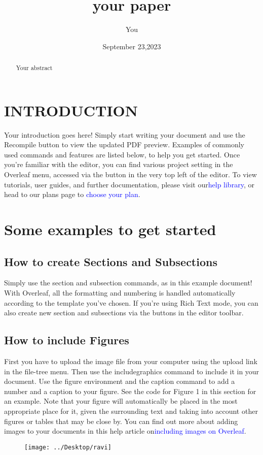 \documentclass{article}
\title{your paper}
\date{September 23,2023}
\author{You}
\begin{document}
	\maketitle
	\begin{abstract}
		Your abstract
		\end{abstract}
	\section{INTRODUCTION}
Your introduction goes here! Simply start writing your document and use the Recompile button to
view the updated PDF preview. Examples of commonly used commands and features are listed below,
to help you get started.
Once you’re familiar with the editor, you can find various project setting in the Overleaf menu,
accessed via the button in the very top left of the editor. To view tutorials, user guides, and further
documentation, please visit our\textcolor{blue}{help library}, or head to our plans page to \textcolor{blue}{choose your plan}.
\section{Some examples to get started}
\subsection{How to create Sections and Subsections}
Simply use the section and subsection commands, as in this example document! With Overleaf, all
the formatting and numbering is handled automatically according to the template you’ve chosen. If
you’re using Rich Text mode, you can also create new section and subsections via the buttons in the
editor toolbar.
\subsection{How to include Figures}
First you have to upload the image file from your computer using the upload link in the file-tree menu.
Then use the includegraphics command to include it in your document. Use the figure environment
and the caption command to add a number and a caption to your figure. See the code for Figure 1 in
this section for an example.
Note that your figure will automatically be placed in the most appropriate place for it, given the
surrounding text and taking into account other figures or tables that may be close by. You can find
out more about adding images to your documents in this help article on\textcolor{blue}{including images on Overleaf}.
\begin{figure}
	\centering
	\texttt{[image: ../Desktop/ravi]}
	\caption{}
	\label{fig:ravi}
\end{figure}
\end{document}
